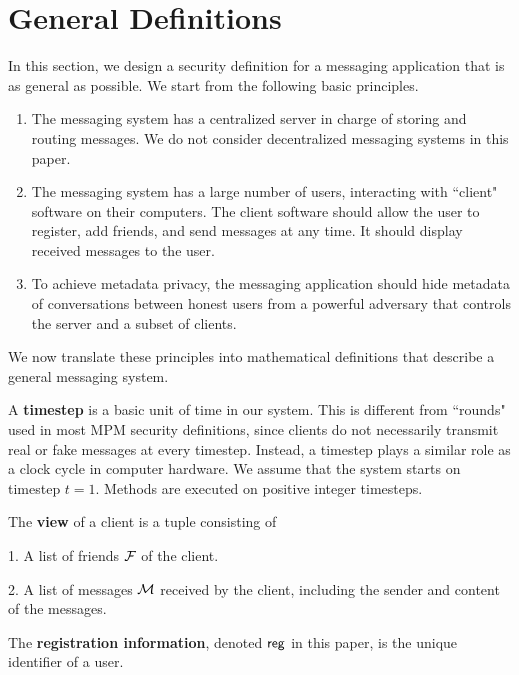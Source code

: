 \section{General Definitions}
\label{sec:general-defn}
In this section, we design a security definition for a messaging application that is as general as possible. We start from the following basic principles.
\begin{enumerate}
    \item The messaging system has a centralized server in charge of storing and routing messages. We do not consider decentralized messaging systems in this paper.
    \item The messaging system has a large number of users, interacting with ``client" software on their computers. The client software should allow the user to register, add friends, and send messages at any time. It should display received messages to the user.
    \item To achieve metadata privacy, the messaging application should hide metadata of conversations between honest users from a powerful adversary that controls the server and a subset of clients. 
\end{enumerate}
We now translate these principles into mathematical definitions that describe a general messaging system.
\begin{definition}
\label{defn:timestep}
A \textbf{timestep} is a basic unit of time in our system. This is different from ``rounds" used in most MPM security definitions, since clients do not necessarily transmit real or fake messages at every timestep. Instead, a timestep plays a similar role as a clock cycle in computer hardware. We assume that the system starts on timestep $t = 1$. Methods are executed on positive integer timesteps.
\end{definition}
\begin{definition}
\label{defn:client-view}
The \textbf{view} of a client is a tuple consisting of

1. A list of friends $\mathcal{F}$ of the client.

2. A list of messages $\mathcal{M}$ received by the client, including the sender and content of the messages.
\end{definition}
\begin{definition}
The \textbf{registration information}, denoted $\mathsf{reg}$ in this paper, is the unique identifier of a user.
\end{definition}
